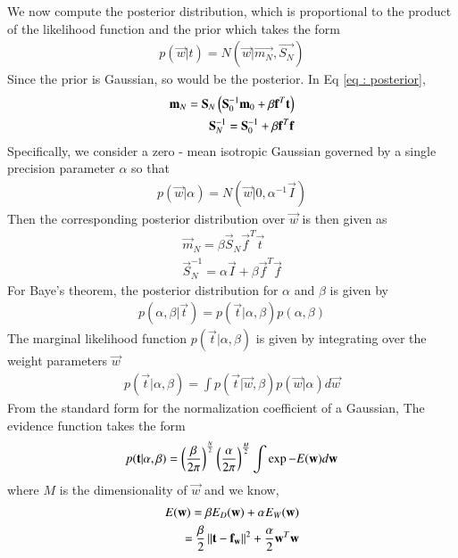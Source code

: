 \documentclass[journal,12pt,twocolumn]{IEEEtran}
\begin{document}
We now compute the posterior distribution, which is proportional to the product of the likelihood function and the prior which takes the form
\begin{align}
    p(\vec{w} | t) = N(\vec{w} | \vec{m_{N}},\vec{S_{N}}) \label{eq : posterior}
\end{align}
Since the prior is Gaussian, so would be the posterior.
In Eq \eqref{eq : posterior},
\begin{align}
       \mathbf{m}_{N} = \mathbf{S}_{N}\left(\mathbf{S}_{0}^{-1}\mathbf{m}_{0} + \beta \mathbf{f}^T \mathbf{t}\right)\\
       \mathbf{S}_{N}^{-1} = \mathbf{S}_{0}^{-1} + \beta \mathbf{f}^{T} \mathbf{f}
\end{align}
Specifically, we consider a zero - mean isotropic Gaussian governed by a single precision parameter $\alpha$ so that
\begin{align}
    p(\vec{w} | \alpha) = N(\vec{w} | 0, \alpha^{-1} \vec{I})
\end{align}
Then the corresponding posterior distribution over $\vec{w}$ is then given as
\begin{align}
    \vec{m}_{N} = \beta\vec{S}_{N} \vec{f}^T \vec{t} \label{eq : mean}\\
    \vec{S}_{N}^{-1} = \alpha \vec{I} + \beta \vec{f}^{T} \vec{f}
\end{align}
For Baye's theorem, the posterior distribution for $\alpha$ and $\beta$ is given by
\begin{align}
    p(\alpha,\beta | \vec{t}) = p(\vec{t} | \alpha,\beta)p(\alpha,\beta)
\end{align}
The marginal likelihood function $p(\vec{t} | \alpha,\beta)$ is given by integrating over the weight parameters $\vec{w}$ 
\begin{align}
    p(\vec{t} | \alpha,\beta) = \int p(\vec{t} | \vec{w},\beta)p(\vec{w} | \alpha)d\vec{w}
\end{align}
From the standard form for the normalization coefficient of a Gaussian, The evidence function takes the form
\begin{align}
     p(\mathbf{t} | \alpha,\beta) = \left(\frac{\beta}{2\pi}\right)^{\frac{N}{2}}\left(\frac{\alpha}{2\pi}\right)^{\frac{M}{2}}
     \int \exp{-E(\mathbf{w})}d\mathbf{w}
\end{align}
where $M$ is the dimensionality of $\vec{w}$ and we know,
\begin{align}
    E(\mathbf{w}) = \beta E_{D}(\mathbf{w}) + \alpha E_{W}(\mathbf{w})\\
=\frac{\beta}{2}\left\lVert\mathbf{t} - \mathbf{f}_{\mathbf{w}}\right\rVert^2 + \frac{\alpha}{2}\mathbf{w}^T\mathbf{w}\label{eq : regularized_ls}
\end{align}
\end{document}
